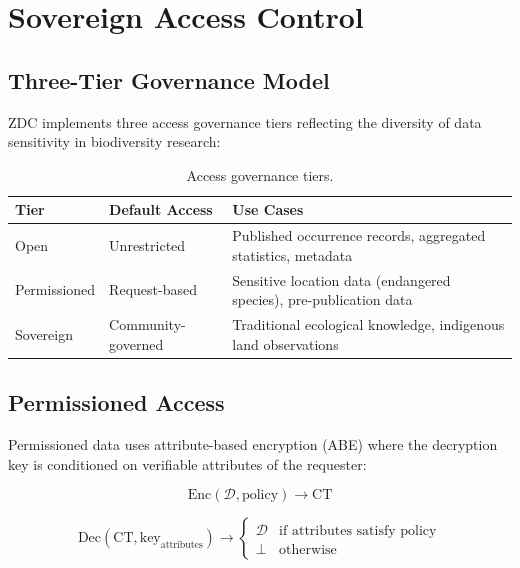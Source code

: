 \section{Sovereign Access Control}

\label{sec:access}

\subsection{Three-Tier Governance Model}

ZDC implements three access governance tiers reflecting the diversity of data sensitivity in biodiversity research:

\begin{table}[H]
\centering
\caption{Access governance tiers.}
\label{tab:access_tiers}
\begin{tabularx}{\textwidth}{@{}llX@{}}
\toprule
\textbf{Tier} & \textbf{Default Access} & \textbf{Use Cases} \\
\midrule
Open & Unrestricted & Published occurrence records, aggregated statistics, metadata \\
Permissioned & Request-based & Sensitive location data (endangered species), pre-publication data \\
Sovereign & Community-governed & Traditional ecological knowledge, indigenous land observations \\
\bottomrule
\end{tabularx}
\end{table}

\subsection{Permissioned Access}

Permissioned data uses attribute-based encryption (ABE) where the decryption key is conditioned on verifiable attributes of the requester:

\begin{equation}
    \text{Enc}(\mathcal{D}, \text{policy}) \rightarrow \text{CT}
\end{equation}

\begin{equation}
    \text{Dec}(\text{CT}, \text{key}_{\text{attributes}}) \rightarrow \begin{cases} \mathcal{D} & \text{if attributes satisfy policy} \\ \perp & \text{otherwise} \end{cases}
\end{equation}

